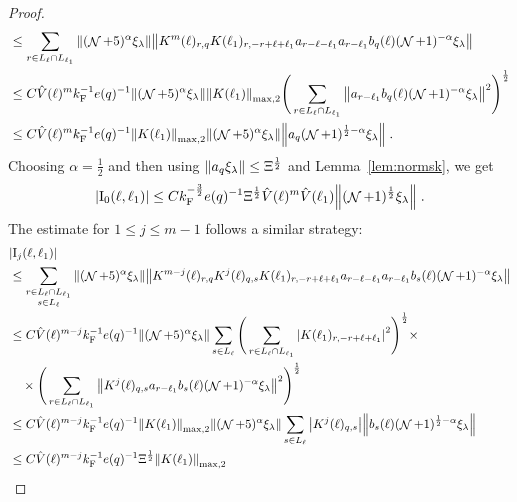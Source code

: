 \documentclass[12pt,a4paper]{article}
\numberwithin{equation}{section}
\newcommand{\1}{\mathbb{I}}
\newcommand{\F}{\mathrm{F}}
\newcommand{\I}{\mathrm{I}}
\DeclareMathOperator{\NN}{\mathcal{N}}
\newcommand{\half}{\frac{1}{2}}
\theoremstyle{plain}
\theoremstyle{definition}
\theoremstyle{remark}
\theoremstyle{plain}
\theoremstyle{definition}
\theoremstyle{remark}
\begin{document}
\begin{proof}
\begin{align}
	&\leq \sum\limits_{r\in L_{\ell} \cap L_{\ell_1}} \norm{  (\NN+5)^{\alpha} \xi_\lambda} \norm{ K^m(\ell )_{r,q} K(\ell_1)_{r,-r+\ell+\ell_1} a_{r-\ell-\ell_1} a_{r-\ell_1} b_{q}(\ell) (\NN+1)^{-\alpha} \xi_\lambda }\nonumber\\
	 &\leq C \hat{V}(\ell)^m k_{\F}^{-1} e(q)^{-1}
	 	\norm{ (\NN+5)^{\alpha} \xi_\lambda} \norm{K(\ell_1) }_{\max,2}
	 	\Bigg( \sum\limits_{r\in L_{\ell} \cap L_{\ell_1}} \norm{ a_{r-\ell_1} b_{q}(\ell) (\NN+1)^{-\alpha} \xi_\lambda }^2 \Bigg)^\half \nonumber\\
	 &\leq C \hat{V}(\ell)^m k_{\F}^{-1} e(q)^{-1}
	 	\norm{K(\ell_1) }_{\max,2}
	 	\norm{(\NN+5)^{\alpha} \xi_\lambda}
	 	\norm{ a_q (\NN+1)^{\half-\alpha} \xi_\lambda } \;.
\end{align}
Choosing $ \alpha = \half $ and then using $ \norm{ a_q \xi_\lambda} \le \Xi^\half $ and Lemma~\ref{lem:normsk}, we get
\begin{equation}
	|\I_0(\ell, \ell_1)|
	\leq C k_{\F}^{-\frac 32} e(q)^{-1} \Xi^\half
		\hat{V}(\ell)^m
		\hat{V}(\ell_1)
		\norm{(\NN+1)^\half \xi_\lambda} \;. \label{eq:estEQ1121}
\end{equation} 
The estimate for $ 1 \le j \le m-1 $ follows a similar strategy:
\begin{align}
	&|\I_j(\ell, \ell_1)| \nonumber\\
	&\leq \sum\limits_{\substack{r\in L_{\ell} \cap L_{\ell_1}\\s\in L_{\ell}}} \norm{  (\NN+5)^{\alpha} \xi_\lambda}\norm{  K^{m-j}(\ell)_{r,q} K^j(\ell)_{q,s} K(\ell_1)_{r,-r+\ell+\ell_1} a_{r-\ell-\ell_1} a_{r-\ell_1} b_{s}(\ell)  (\NN+1)^{-\alpha} \xi_\lambda }\nonumber\\
	&\leq C \hat{V}(\ell)^{m-j} k_{\F}^{-1} e(q)^{-1}
		\norm{ (\NN+5)^{\alpha} \xi_\lambda} 
		\sum\limits_{s\in L_{\ell}} 
		\Bigg(\sum\limits_{r\in L_{\ell} \cap L_{\ell_1}}\abs{ K(\ell_1)_{r,-r+\ell+\ell_1} }^2\Bigg)^\half \times\nonumber\\ 
	&\quad \times\Bigg( \sum\limits_{r\in L_{\ell} \cap L_{\ell_1}}\norm{K^{j}(\ell)_{q,s} a_{r-\ell_1} b_{s}(\ell)  (\NN+1)^{-\alpha} \xi_\lambda }^2 \Bigg)^\half \nonumber\\
	&\leq C \hat{V}(\ell)^{m-j} k_{\F}^{-1} e(q)^{-1}
		\norm{K(\ell_1)}_{\max,2} \norm{ (\NN+5)^{\alpha} \xi_\lambda}
		\sum\limits_{s\in L_{\ell}}\abs{K^{j}(\ell)_{q,s}}
		\norm{  b_{s}(\ell)  (\NN+1)^{\half-\alpha} \xi_\lambda }		
	\nonumber\\
	&\leq C \hat{V}(\ell)^{m-j} k_{\F}^{-1} e(q)^{-1} \Xi^\half
		\norm{ K(\ell_1) }_{\max,2}

\end{align}
\end{proof}
\end{document}
